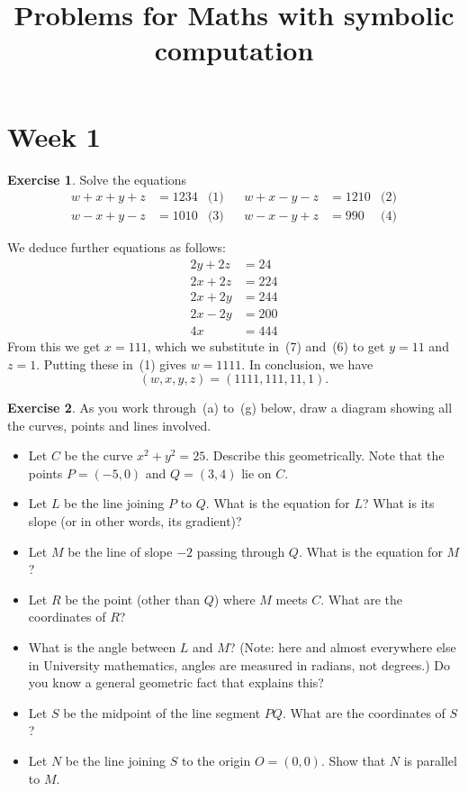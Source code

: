 \documentclass[a4paper]{amsart}
\title{Problems for Maths with symbolic computation}
\theoremstyle{definition}
\newtheorem{exercise}{Exercise}[section]
\newenvironment{solution}{{\noindent \bf Solution:}}{}
\begin{document}
\maketitle

\section*{Week 1}
\addtocounter{section}{1}\setcounter{exercise}{0}

\begin{exercise}\label{ex-lin-misc-i}
Solve the equations
 \begin{align*}
  w+x+y+z &= 1234 & \text{(1)} & &
  w+x-y-z &= 1210 & \text{(2)} \\
  w-x+y-z &= 1010 & \text{(3)} & &
  w-x-y+z &=  990 & \text{(4)}
 \end{align*}
\end{exercise}
\begin{solution}
We deduce further equations as follows:
 \begin{align*}
  2y+2z &= 24  \tag{(5)=(1)-(2)} \\
  2x+2z &= 224 \tag{(6)=(1)-(3)} \\
  2x+2y &= 244 \tag{(7)=(1)-(4)} \\
  2x-2y &= 200 \tag{(8)=(6)-(5)} \\
  4x    &= 444 \tag{(9)=(7)+(8)}
 \end{align*}
 From this we get $x=111$, which we substitute in~(7) and~(6) to get
 $y=11$ and $z=1$.  Putting these in~(1) gives $w=1111$.  In
 conclusion, we have
 \[ (w,x,y,z) = (1111,111,11,1). \]
\end{solution}
\begin{exercise}\label{ex-circ-geom}
As you work through~(a) to~(g) below, draw a diagram showing all the
 curves, points and lines involved.
 \begin{itemize} 
  \item[(a)] Let $C$ be the curve $x^2+y^2=25$.  Describe this
   geometrically.  Note that the points $P=(-5,0)$ and $Q=(3,4)$ lie
   on $C$.
  \item[(b)] Let $L$ be the line joining $P$ to $Q$.  What is the
   equation for $L$?  What is its slope (or in other words, its gradient)? 
  \item[(c)] Let $M$ be the line of slope $-2$ passing through $Q$.
   What is the equation for $M$?  
  \item[(d)] Let $R$ be the point (other than $Q$) where $M$ meets
   $C$.  What are the coordinates of $R$?
  \item[(e)] What is the angle between $L$ and $M$?  (Note: here and almost
   everywhere else in University mathematics, angles are measured in
   radians, not degrees.)  Do you know a general geometric fact that
   explains this?   
  \item[(f)] Let $S$ be the midpoint of the line segment $PQ$.  What
   are the coordinates of $S$?
  \item[(g)] Let $N$ be the line joining $S$ to the origin $O=(0,0)$.
   Show that $N$ is parallel to $M$.
 \end{itemize}
\end{exercise}
\end{document}
